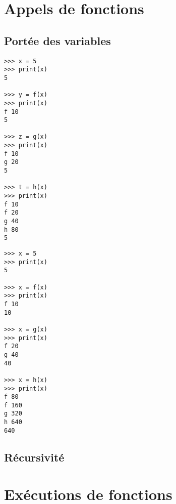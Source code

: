 \documentclass[11pt,a4paper]{article}
\begin{document}
\centerline{}

\section{Appels de fonctions}

\subsection{Portée des variables}
%

\begin{minipage}[t]{7cm}\footnotesize
\begin{verbatim}
>>> x = 5
>>> print(x)
5

>>> y = f(x)
>>> print(x)
f 10
5

>>> z = g(x)
>>> print(x)
f 10
g 20
5

>>> t = h(x)
>>> print(x)
f 10
f 20
g 40
h 80
5
\end{verbatim}
\end{minipage}
\hfill
\begin{minipage}[t]{7cm}\footnotesize
\begin{verbatim}
>>> x = 5
>>> print(x)
5

>>> x = f(x)
>>> print(x)
f 10
10

>>> x = g(x)
>>> print(x)
f 20
g 40
40

>>> x = h(x)
>>> print(x)
f 80
f 160
g 320
h 640
640
\end{verbatim}
\end{minipage}


\subsection{Récursivité}


\section{Exécutions de fonctions}
\end{document}
